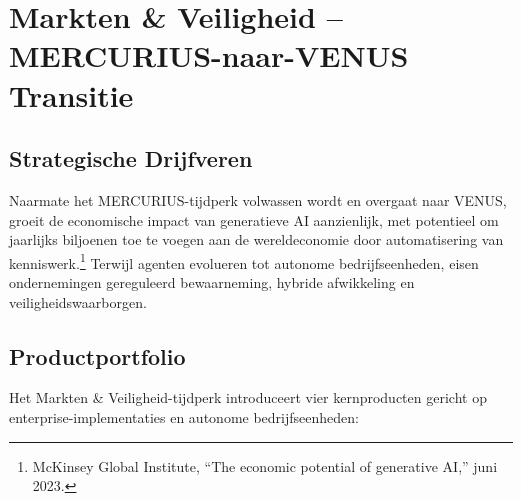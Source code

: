 \documentclass[11pt]{article}
\begin{document}
\section{Markten \& Veiligheid -- MERCURIUS-naar-VENUS Transitie}
\subsection{Strategische Drijfveren}
Naarmate het MERCURIUS-tijdperk volwassen wordt en overgaat naar VENUS, groeit de economische impact van generatieve AI aanzienlijk, met potentieel om jaarlijks biljoenen toe te voegen aan de wereldeconomie door automatisering van kenniswerk.\footnote{McKinsey Global Institute, ``The economic potential of generative AI,'' juni 2023.} Terwijl agenten evolueren tot autonome bedrijfseenheden, eisen ondernemingen gereguleerd bewaarneming, hybride afwikkeling en veiligheidswaarborgen.

\subsection{Productportfolio}
Het Markten \& Veiligheid-tijdperk introduceert vier kernproducten gericht op enterprise-implementaties en autonome bedrijfseenheden:
\end{document}
